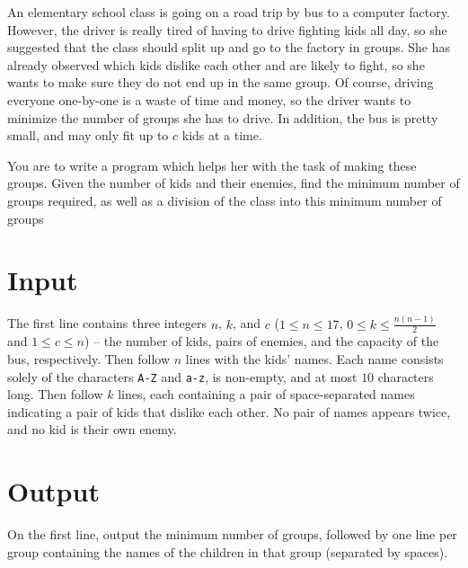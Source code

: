
\noindent
An elementary school class is going on a road trip by bus to a
computer factory. However, the driver is really tired of having to
drive fighting kids all day, so she suggested that the class should
split up and go to the factory in groups.  She has already observed
which kids dislike each other and are likely to fight, so she wants to
make sure they do not end up in the same group. Of course, driving
everyone one-by-one is a waste of time and money, so the driver wants
to minimize the number of groups she has to drive. In addition, the bus
is pretty small, and may only fit up to $c$ kids at a time.

You are to write a program which helps her with the task of making
these groups. Given the number of kids and their enemies, find the
minimum number of groups required, as well as a division of the class
into this minimum number of groups

\section*{Input}

The first line contains three integers $n$, $k$, and $c$ ($1 \le n \le 17$, $0 \le
k \le \frac{n(n-1)}{2}$ and $1 \le c \le n$) -- the number of kids,
pairs of enemies, and the capacity of the bus, respectively. Then
follow $n$ lines with the kids' names. Each name consists solely of
the characters \texttt{A-Z} and \texttt{a-z}, is non-empty, and at most $10$
characters long. Then follow $k$ lines, each containing a pair of
space-separated names indicating a pair of kids that dislike each
other. No pair of names appears twice, and no kid is their own enemy.

\section*{Output}

On the first line, output the minimum number of groups, followed by
one line per group containing the names of the children in that group
(separated by spaces).
